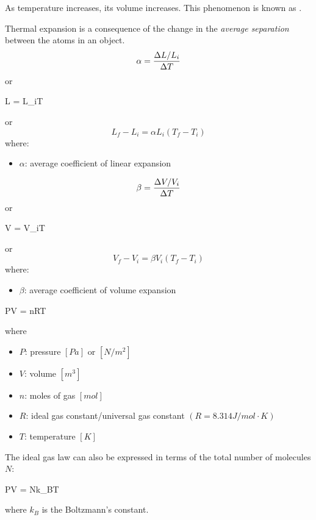         \par As temperature increases, its volume increases. This phenomenon is known as
        .
        \par Thermal expansion is a consequence of the change in the \textit{average
        separation} between the atoms in an object.
        \begin{equation}
            \alpha = \frac{\Delta L / L_{i}}{\Delta T}
        \end{equation}
        or
        \begin{eqbox}
            \Dt L = \alpha L_{i}\Dt T
        \end{eqbox}
        or
        \begin{equation}
            L_{f} - L_{i} = \alpha L_{i} (T_{f} - T_{i})
        \end{equation}
        where:
        \begin{itemize}
            \item $\alpha$: average coefficient of linear expansion
        \end{itemize}
        \begin{equation}
            \beta = \frac{\Delta V / V_{i}}{\Delta T}
        \end{equation}
        or
        \begin{eqbox}
            \Dt V = \beta V_{i}\Dt T
        \end{eqbox}
        or
        \begin{equation}
            V_{f} - V_{i} = \beta V_{i} (T_{f} - T_{i})
        \end{equation}
        where:
        \begin{itemize}
            \item $\beta$: average coefficient of volume expansion
        \end{itemize}

        \begin{eqbox}
            PV = nRT
        \end{eqbox}
        where
        \begin{itemize}
            \item $P$: pressure $[Pa]$ or $[N/m^{2}]$
            \item $V$: volume $[m^{3}]$
            \item $n$: moles of gas $[mol]$
            \item $R$: ideal gas constant/universal gas constant
                $(R = 8.314 J/mol \cdot K)$
            \item $T$: temperature $[K]$
        \end{itemize}
        \par The ideal gas law can also be expressed in terms of the total number of
        molecules $N$:
        \begin{eqbox}
            PV = Nk_{B}T
        \end{eqbox}
        where $k_{B}$ is the Boltzmann's constant.